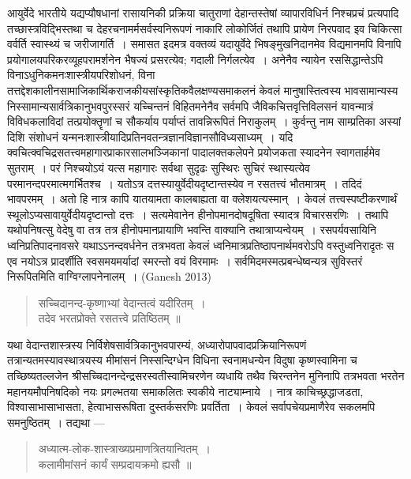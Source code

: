 {\dev आयुर्वेदे भारतीये यद्यप्यौषधानां रासायनिकी प्रक्रिया चातुराणां देहान्तस्तेषां व्यापारविधिर्न निश्चप्रचं प्रत्यपादि तच्छास्त्रविद्भिस्तथा च देहरचनामर्मसर्वस्वनिरूपणं नाकारि लोकोर्जितं तथापि प्रायेण निरपवाद इव चिकित्सा वर्वर्ति स्वास्थ्यं च जरीजागर्ति~। समासत इदमत्र वक्तव्यं यदायुर्वेदे भिषङ्मुखनिदानमेव विद्यमानमपि विनापि प्रयोगालयपरिकरव्यूहपरामर्श\-नेन भैषज्यं प्रसरत्येव; गदाली निर्गलत्येव~। अनेनैव न्यायेन रससिद्धान्तेऽपि विनाऽधुनिक\-मनः\-शास्त्रीयपरिशोधनं, विना तत्तद्देशकालीनसामाजिकार्थिकराजकीयसांस्कृतिकवैलक्षण्य\-समा\-कलनं केवलं मानुषास्तित्वस्य भावसामान्यस्य निस्सामान्यसार्वत्रिकानुभवपुरस्सरं यच्चिन्तनं विहितमनेनैव सर्वमपि जैविकचित्तवृत्तिविलसनं यावन्मात्रं विविधकलाविदां तत्प्रयोक्तॄणां च सौकर्याय पर्याप्तं तावन्निरूपितं निराकुलम्~। कुर्वन्तु नाम साम्प्रतिका अस्यां दिशि संशोधनं यन्मनःशास्त्रीयादिप्रतिनवतन्त्रज्ञानविज्ञानसौविध्यसाध्यम्~। यदि क्वचित्क्वचिद्रसतत्त्वमहा\-गारप्राकारसालभञ्जिकानां पादालक्तकलेपने प्रयोजकता स्यादनेन स्वागतार्हमेव सुतराम्~। परं निश्चयोऽयं यत्स महागारः सर्वथा सुदृढः सुस्थिरः सुचिरं स्थास्यत्येव परमानन्दपरमात्म\-गर्भितश्च~। यतोऽत्र दत्तस्यायुर्वेदीयदृष्टान्तस्येव न रसतत्त्वं भौतमात्रम्~। तदिदं भावपरमम्~। अतो हि नात्र कापि यातयामता कालबाह्यता वा क्लेशयत्यस्मान्~। केवलं तत्त्वस्पष्टीकर\-णार्थं स्थूलोऽप्यसावायुर्वेदीयदृष्टान्तो दत्तः~। सत्यमेवानेन हीनोपमानदोषदूषिता स्यादत्र विचार\-सरणिः~। तथापि यथोपनिषत्सु वेदेषु वा तत्र तत्र हीनोपमानप्रायाणि भवन्ति वाक्यानि तथात्रा\-प्यन्वेयम्~। रसपर्यवसायिनि ध्वनिप्रतिपादनावसरे यथाऽऽनन्दवर्धनेन तत्रभवता केवलं ध्वनि\-मात्रप्रतिष्ठापनार्थमवरोऽपि वस्तुध्वनिरादृतः स एव नयोऽत्र प्रादर्शीति स्वसमयमर्यादां स्मरन्तो वयं विरमामः~। सर्वमिदमस्मत्प्रबन्धेष्वन्यत्र सुविस्तरं निरूपितमिति वाग्विग्लापनेनालम्~।} (Ganesh 2013) 
\begin{quote}
{\dev सच्चिदानन्द-कृष्णाभ्यां वेदान्तत्वं यदीरितम्~।}\\
{\dev तदेव भरतप्रोक्ते रसतत्त्वे प्रतिष्ठितम् ॥}
\end{quote}

{\dev यथा वेदान्तशास्त्रस्य निर्विशेषसार्वत्रिकानुभवपारम्यं, अध्यारोपापवादप्रक्रियानिरूपणं तत्रान्य\-तमस्यावस्थात्रयस्य मीमांसनं निस्सन्दिग्धेन विधिना स्वनामधन्येन विदुषा कृष्णस्वामिना च तच्छिष्यतल्लजेन श्रीसच्चिदानन्देन्द्रसरस्वतीस्वामिचरणेन व्यधायि तथैव चिरन्तनेन मुनिनापि तत्रभवता भरतेन महानयमौपनिषदिको नयः प्रगल्भतया समाकलितः स्वकीये नाट्याम्नाये~। नात्र काचिच्छ्रद्धाजडता, विश्वासाभासाभासता, हेत्वाभासरूषिता दुस्तर्कसरणिः प्रवर्तिता~। केवलं सर्वापचेयप्रमाणैरेव सकलमपि समनुष्ठितम्~। तद्यथा ---} 
\begin{quote}
{\dev अध्यात्म-लोक-शास्त्राख्यप्रमाणत्रितयान्वितम्~।}\\
{\dev कलामीमांसनं कार्यं सम्प्रदायक्रमो ह्यसौ ॥}
\end{quote}

